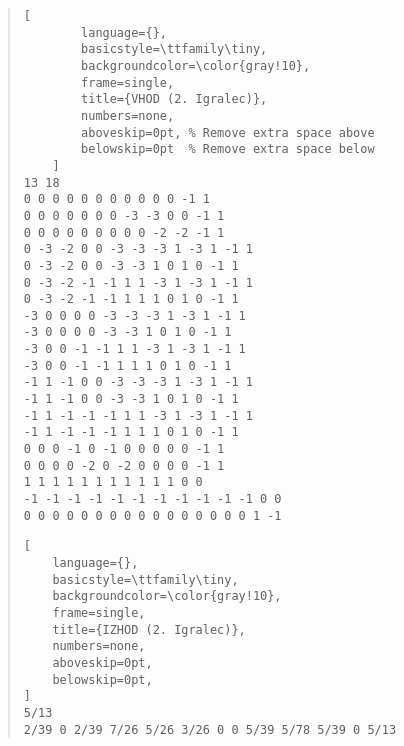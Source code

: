 \documentclass{article}
\begin{document}
\begin{enumerate}[label=\alph*)]
\begin{quote}
    \begin{lstlisting}[
        language={}, 
        basicstyle=\ttfamily\tiny, 
        backgroundcolor=\color{gray!10}, 
        frame=single, 
        title={VHOD (2. Igralec)},
        numbers=none,
        aboveskip=0pt, % Remove extra space above
        belowskip=0pt  % Remove extra space below
    ]
13 18
0 0 0 0 0 0 0 0 0 0 0 -1 1
0 0 0 0 0 0 0 -3 -3 0 0 -1 1
0 0 0 0 0 0 0 0 0 -2 -2 -1 1
0 -3 -2 0 0 -3 -3 -3 1 -3 1 -1 1
0 -3 -2 0 0 -3 -3 1 0 1 0 -1 1
0 -3 -2 -1 -1 1 1 -3 1 -3 1 -1 1
0 -3 -2 -1 -1 1 1 1 0 1 0 -1 1
-3 0 0 0 0 -3 -3 -3 1 -3 1 -1 1
-3 0 0 0 0 -3 -3 1 0 1 0 -1 1
-3 0 0 -1 -1 1 1 -3 1 -3 1 -1 1
-3 0 0 -1 -1 1 1 1 0 1 0 -1 1
-1 1 -1 0 0 -3 -3 -3 1 -3 1 -1 1
-1 1 -1 0 0 -3 -3 1 0 1 0 -1 1
-1 1 -1 -1 -1 1 1 -3 1 -3 1 -1 1
-1 1 -1 -1 -1 1 1 1 0 1 0 -1 1
0 0 0 -1 0 -1 0 0 0 0 0 -1 1
0 0 0 0 -2 0 -2 0 0 0 0 -1 1
1 1 1 1 1 1 1 1 1 1 1 0 0
-1 -1 -1 -1 -1 -1 -1 -1 -1 -1 -1 0 0
0 0 0 0 0 0 0 0 0 0 0 0 0 0 0 0 1 -1
    \end{lstlisting}
    \begin{lstlisting}[
    language={}, 
    basicstyle=\ttfamily\tiny, 
    backgroundcolor=\color{gray!10}, 
    frame=single, 
    title={IZHOD (2. Igralec)},
    numbers=none,
    aboveskip=0pt,
    belowskip=0pt,
]
5/13
2/39 0 2/39 7/26 5/26 3/26 0 0 5/39 5/78 5/39 0 5/13 
\end{lstlisting}
\end{quote}

\end{enumerate}
\end{document}
